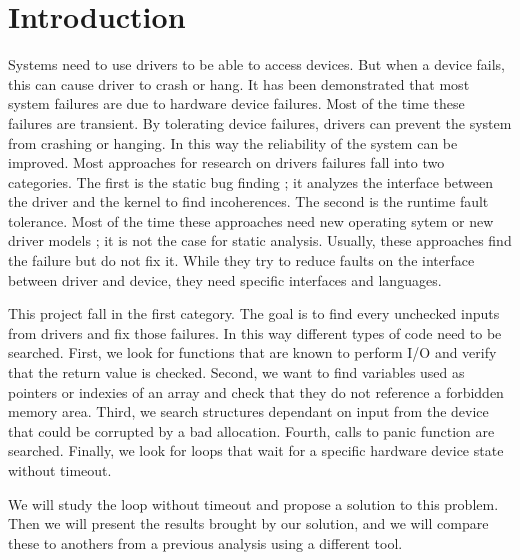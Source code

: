 \documentclass[a4paper,12pt]{article}
\begin{document}
\vfill


\tableofcontents
\vfill



\newpage\section{Introduction}

Systems need to use drivers to be able to access devices. But when a device fails, this can cause driver to crash or hang. It has been demonstrated \cite{Carburizer} that most system failures are due to hardware device failures. Most of the time these failures are transient. By tolerating device failures, drivers can prevent the system from crashing or hanging. In this way the reliability of the system can be improved. Most approaches for research on drivers failures fall into two categories. The first is the static bug finding ; it analyzes the interface between the driver and the kernel to find incoherences. The second is the runtime fault tolerance. Most of the time these approaches need new operating sytem or new driver models ; it is not the case for static analysis. Usually, these approaches find the failure but do not fix it. While they try to reduce faults on the interface between driver and device, they need specific interfaces and languages.

This project fall in the first category. The goal is to find every unchecked inputs from drivers and fix those failures. In this way different types of code need to be searched. First, we look for functions that are known to perform I/O and verify that the return value is checked. Second, we want to find variables used as pointers or indexies of an array and check that they do not reference a forbidden memory area. Third, we search structures dependant on input from the device that could be corrupted by a bad allocation. Fourth, calls to panic function are searched. Finally, we look for loops that wait for a specific hardware device state without timeout.

We will study the loop without timeout and propose a solution to this problem. Then we will present the results brought by our solution, and we will compare these to anothers from a previous analysis using a different tool.
\end{document}
